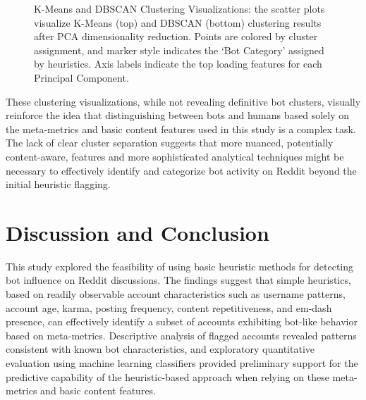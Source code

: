 \documentclass[
  12pt,
  letterpaper,
  DIV=11,
  numbers=noendperiod]{scrartcl}
\begin{document}
\begin{figure}


\caption{\label{fig-clust}K-Means and DBSCAN Clustering Visualizations:
the scatter plots visualize K-Means (top) and DBSCAN (bottom) clustering
results after PCA dimensionality reduction. Points are colored by
cluster assignment, and marker style indicates the `Bot Category'
assigned by heuristics. Axis labels indicate the top loading features
for each Principal Component.}

\end{figure}%

These clustering visualizations, while not revealing definitive bot
clusters, visually reinforce the idea that distinguishing between bots
and humans based solely on the meta-metrics and basic content features
used in this study is a complex task. The lack of clear cluster
separation suggests that more nuanced, potentially content-aware,
features and more sophisticated analytical techniques might be necessary
to effectively identify and categorize bot activity on Reddit beyond the
initial heuristic flagging.

\section{Discussion and Conclusion}\label{discussion-and-conclusion}

This study explored the feasibility of using basic heuristic methods for
detecting bot influence on Reddit discussions. The findings suggest that
simple heuristics, based on readily observable account characteristics
such as username patterns, account age, karma, posting frequency,
content repetitiveness, and em-dash presence, can effectively identify a
subset of accounts exhibiting bot-like behavior based on meta-metrics.
Descriptive analysis of flagged accounts revealed patterns consistent
with known bot characteristics, and exploratory quantitative evaluation
using machine learning classifiers provided preliminary support for the
predictive capability of the heuristic-based approach when relying on
these meta-metrics and basic content features.
\end{document}
